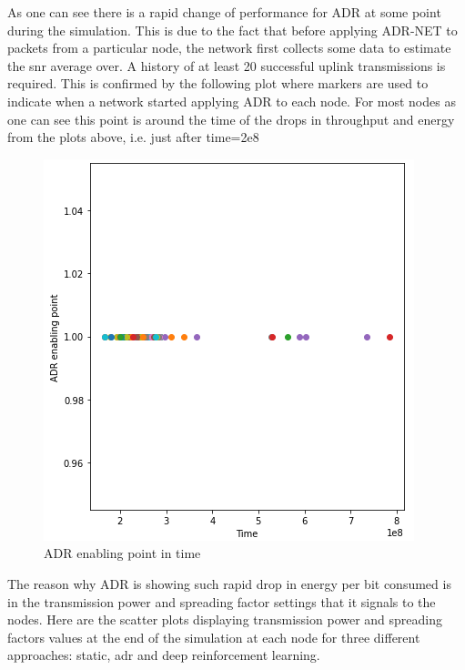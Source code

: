 As one can see there is a rapid change of performance for
ADR at some point during the simulation. This is due to
the fact that before applying ADR-NET to packets from a
particular node, the network first collects some data
to estimate the snr average over. A history of at least 20 successful uplink transmissions is required. This is 
confirmed by the following plot where markers are used 
to indicate when a network started applying ADR to each 
node. For most nodes as one can see this point is around
the time of the drops in throughput and energy from the plots above, i.e. just after time=2e8

\begin{figure}[H]
\centering
\hspace*{-0.5cm}  
\includegraphics[scale=0.70]{plots/adr/adr_enabling_point.PNG}
  \caption{ADR enabling point in time}
\end{figure}

The reason why ADR is showing such rapid drop in energy
per bit consumed is in the transmission power and 
spreading factor settings that it signals to the nodes.
Here are the scatter plots displaying transmission power and spreading factors values at the end of the simulation
at each node for three different approaches: static, adr 
and deep reinforcement learning.

